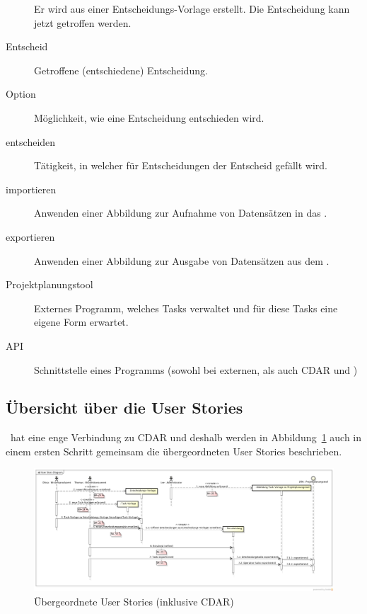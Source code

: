 \begin{description}
				Er wird aus einer Entscheidungs-Vorlage erstellt.
				Die Entscheidung kann jetzt getroffen werden.
			\item[Entscheid] Getroffene (entschiedene) Entscheidung.
			\item[Option] Möglichkeit, wie eine Entscheidung entschieden wird.
			\item[entscheiden] Tätigkeit, in welcher für Entscheidungen der Entscheid gefällt wird.
			\item[importieren] Anwenden einer Abbildung zur Aufnahme von Datensätzen in das \eeppi.
			\item[exportieren] Anwenden einer Abbildung zur Ausgabe von Datensätzen aus dem \eeppi.
			\item[Projektplanungstool] Externes Programm, welches Tasks verwaltet und für diese Tasks eine eigene Form erwartet.
			\item[API] Schnittstelle eines Programms (sowohl bei externen, als auch CDAR und \eeppi)
		\end{description}

	\subsection{Übersicht über die User Stories}
	
		\eeppi\ hat eine enge Verbindung zu CDAR und deshalb werden in Abbildung~\ref{fig:UserStoryDiagram} auch in einem ersten Schritt gemeinsam die übergeordneten User Stories beschrieben.
	
		\begin{figure}[H]
			\begin{minipage}[b]{\linewidth}
				\includegraphics[width=\textwidth]{media/diagrams/UserStoryDiagram.png}
				\centering
				\caption{Übergeordnete User Stories (inklusive CDAR)}
				\label{fig:UserStoryDiagram}
			\end{minipage}
		\end{figure}
		

